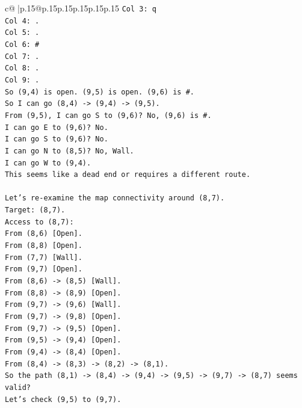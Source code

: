 \documentclass{article}
\begin{document}
{\begin{supertabular}{c@{$\;$}|p{.15\linewidth}@{}p{.15\linewidth}p{.15\linewidth}p{.15\linewidth}p{.15\linewidth}p{.15\linewidth}}
{{{\texttt{Col 3: q} \\
\texttt{Col 4: .} \\
\texttt{Col 5: .} \\
\texttt{Col 6: \#} \\
\texttt{Col 7: .} \\
\texttt{Col 8: .} \\
\texttt{Col 9: .} \\
\texttt{So (9,4) is open. (9,5) is open. (9,6) is \#.} \\
\texttt{So I can go (8,4) {-}> (9,4) {-}> (9,5).} \\
\texttt{From (9,5), I can go S to (9,6)? No, (9,6) is \#.} \\
\texttt{I can go E to (9,6)? No.} \\
\texttt{I can go S to (9,6)? No.} \\
\texttt{I can go N to (8,5)? No, Wall.} \\
\texttt{I can go W to (9,4).} \\
\texttt{This seems like a dead end or requires a different route.} \\
\\ 
\texttt{Let's re{-}examine the map connectivity around (8,7).} \\
\texttt{Target: (8,7).} \\
\texttt{Access to (8,7):} \\
\texttt{From (8,6) {[}Open{]}.} \\
\texttt{From (8,8) {[}Open{]}.} \\
\texttt{From (7,7) {[}Wall{]}.} \\
\texttt{From (9,7) {[}Open{]}.} \\
\texttt{From (8,6) {-}> (8,5) {[}Wall{]}.} \\
\texttt{From (8,8) {-}> (8,9) {[}Open{]}.} \\
\texttt{From (9,7) {-}> (9,6) {[}Wall{]}.} \\
\texttt{From (9,7) {-}> (9,8) {[}Open{]}.} \\
\texttt{From (9,7) {-}> (9,5) {[}Open{]}.} \\
\texttt{From (9,5) {-}> (9,4) {[}Open{]}.} \\
\texttt{From (9,4) {-}> (8,4) {[}Open{]}.} \\
\texttt{From (8,4) {-}> (8,3) {-}> (8,2) {-}> (8,1).} \\
\texttt{So the path (8,1) {-}> (8,4) {-}> (9,4) {-}> (9,5) {-}> (9,7) {-}> (8,7) seems valid?} \\
\texttt{Let's check (9,5) to (9,7).} \\
}}}
\end{supertabular}}
\end{document}
